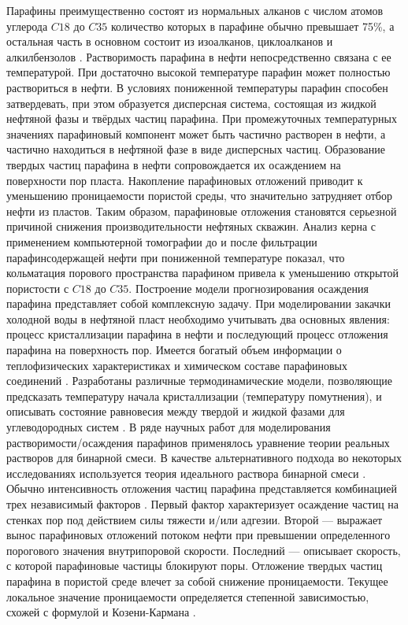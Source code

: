 \documentclass[12pt,twoside,a4paper]{uz_ku}
\begin{document}
	Парафины преимущественно состоят из нормальных алканов с числом атомов углерода $C18$ до $C35$ количество которых в парафине обычно превышает 75\%, а остальная часть в основном состоит из изоалканов, циклоалканов и алкилбензолов \cite{4}. Растворимость парафина в нефти непосредственно связана с ее температурой. При достаточно высокой температуре парафин может полностью раствориться в нефти. В условиях пониженной температуры парафин способен затвердевать, при этом образуется дисперсная система, состоящая из жидкой нефтяной фазы и твёрдых частиц парафина. При промежуточных температурных значениях парафиновый компонент может быть частично растворен в нефти, а частично находиться в нефтяной фазе в виде дисперсных частиц. Образование твердых частиц парафина в нефти сопровождается их осаждением на поверхности пор пласта. Накопление парафиновых отложений приводит к уменьшению проницаемости пористой среды, что значительно затрудняет отбор нефти из пластов.  Таким образом, парафиновые отложения становятся серьезной причиной снижения производительности нефтяных скважин. Анализ керна с применением компьютерной томографии до и после фильтрации парафинсодержащей нефти при пониженной температуре \cite{9} показал, что кольматация порового пространства парафином привела к уменьшению открытой пористости с $C18$ до $C35$. Построение модели прогнозирования осаждения парафина представляет собой комплексную задачу. При моделировании закачки холодной воды в нефтяной пласт необходимо учитывать два основных явления: процесс кристаллизации парафина в нефти и последующий процесс отложения парафина на поверхность пор. Имеется богатый объем информации о теплофизических характеристиках и химическом составе парафиновых соединений \cite{3}. Разработаны различные термодинамические модели, позволяющие предсказать температуру начала кристаллизации (температуру помутнения), и описывать состояние равновесия между твердой и жидкой фазами для углеводородных систем \cite{4, 5, 6}. В ряде научных работ для моделирования растворимости/осаждения парафинов применялось уравнение теории реальных растворов для бинарной смеси. В качестве альтернативного подхода во некоторых исследованиях используется теория идеального раствора бинарной смеси \cite{7, 8}. Обычно интенсивность отложения частиц парафина представляется комбинацией трех независимый факторов \cite{2, 5, 6, 9}. Первый фактор характеризует осаждение частиц на стенках пор под действием силы тяжести и/или адгезии. Второй — выражает вынос парафиновых отложений потоком нефти при превышении определенного порогового значения внутрипоровой скорости. Последний — описывает скорость, с которой парафиновые частицы блокируют поры. Отложение твердых частиц парафина в пористой среде влечет за собой снижение проницаемости. Текущее локальное значение проницаемости определяется степенной зависимостью, схожей с формулой и Козени-Кармана \cite{10}.
\end{document}
